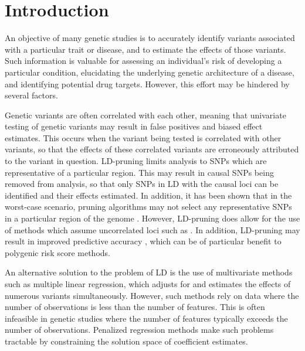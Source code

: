 
\section{Introduction}

An objective of many genetic studies is to accurately identify variants associated with a particular trait or disease, and to estimate the effects of those variants. Such information is valuable for assessing an individual's risk of developing a particular condition, elucidating the underlying genetic architecture of a disease, and identifying potential drug targets. However, this effort may be hindered by several factors. 

Genetic variants are often correlated with each other, meaning that univariate testing of genetic variants may result in false positives and biased effect estimates. This occurs when the variant being tested is correlated with other variants, so that the effects of these correlated variants are erroneously attributed to the variant in question.  LD-pruning limits analysis to SNPs which are representative of a particular region. This may result in causal SNPs being removed from analysis, so that only SNPs in LD with the causal loci can be identified and their effects estimated. In addition, it has been shown that in the worst-case scenario, pruning algorithms may not select any representative SNPs in a particular region of the genome \cite{prive2018efficient}. However, LD-pruning does allow for the use of methods which assume uncorrelated loci such as . In addition, LD-pruning may result in improved predictive accuracy , which can be of particular benefit to polygenic risk score methods.  

An alternative solution to the problem of LD is the use of multivariate methods such as multiple linear regression, which adjusts for and estimates the effects of numerous variants simultaneously. However, such methods rely on data where the number of observations is less than the number of features. This is often infeasible in genetic studies where the number of features typically exceeds the number of observations. Penalized regression methods make such problems tractable by constraining the solution space of coefficient estimates.

